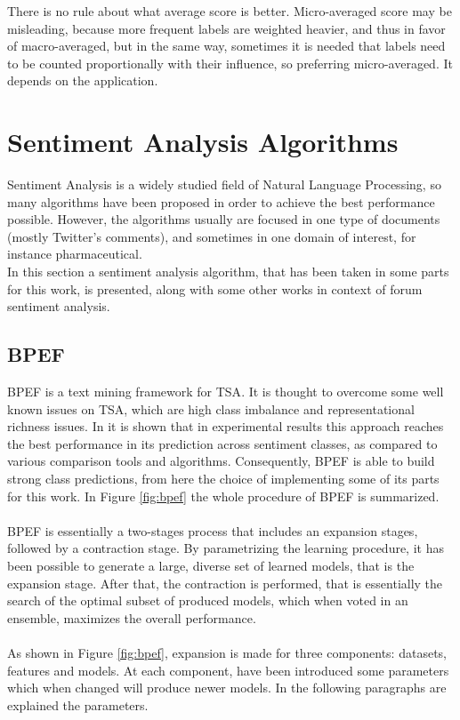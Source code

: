 There is no rule about what average score is better. Micro-averaged score may be misleading, because more frequent labels are weighted heavier, and thus in favor of macro-averaged, but in the same way, sometimes it is needed that labels need to be counted proportionally with their influence, so preferring micro-averaged. It depends on the application.



\section{Sentiment Analysis Algorithms}

Sentiment Analysis is a widely studied field of Natural Language Processing, so many algorithms have been proposed in order to achieve the best performance possible. However, the algorithms usually are focused in one type of documents (mostly Twitter's comments), and sometimes in one domain of interest, for instance pharmaceutical.\\
In this section a sentiment analysis algorithm, that has been taken in some parts for this work, is presented, along with some other works in context of forum sentiment analysis.


\subsection{BPEF}

\ac{BPEF} \cite{Hassan2013TwitterSA} is a text mining framework for \acl{TSA}. It is thought to overcome some well known issues on \ac{TSA}, which are high class imbalance and representational richness issues. In \cite{Zimbra:2018:STS:3210372.3185045} it is shown that in experimental results this approach reaches the best performance in its prediction across sentiment classes, as compared to various comparison tools and algorithms. Consequently, \ac{BPEF} is able to build strong class predictions, from here the choice of implementing some of its parts for this work. In Figure \ref{fig:bpef} the whole procedure of \ac{BPEF} is summarized.\\
\\
\ac{BPEF} is essentially a two-stages process that includes an expansion stages, followed by a contraction stage. By parametrizing the learning procedure, it has been possible to generate a large, diverse set of learned models, that is the expansion stage. After that, the contraction is performed, that is essentially the search of the optimal subset of produced models, which when voted in an ensemble, maximizes the overall performance.\\
\\
As shown in Figure \ref{fig:bpef}, expansion is made for three components: datasets, features and models. At each component, have been introduced some parameters which when changed will produce newer models. In the following paragraphs are explained the parameters.


